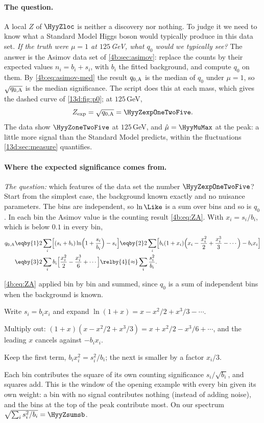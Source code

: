 \paragraph{The question.}
A local $Z$ of $\HyyZloc$ is neither a discovery nor nothing. To judge it we need to know
what a Standard Model Higgs boson would typically produce in this data set. \emph{If the
truth were $\mu=1$ at $125\,$GeV, what $q_0$ would we typically see?} The answer is the
Asimov data set of \cref{4b:sec:asimov}: replace the counts by their expected values
$n_i=b_i+s_i$, with $b_i$ the fitted background, and compute $q_0$ on them. By
\eqref{4b:eq:asimov-med} the result $q_{0,\rm A}$ is the median of $q_0$ under $\mu=1$, so
$\sqrt{q_{0,\rm A}}$ is the median significance. The script does this at each mass, which
gives the dashed curve of \cref{13d:fig:p0}; at $125\,$GeV,
\[
  Z_{\rm exp}=\sqrt{q_{0,\rm A}}=\HyyZexpOneTwoFive .
\]
The data show $\HyyZoneTwoFive$ at $125\,$GeV, and $\hat\mu=\HyyMuMax$ at the peak: a
little more signal than the Standard Model predicts, within the fluctuations
\cref{13d:sec:measure} quantifies.

\paragraph{Where the expected significance comes from.}
\emph{The question:} which features of the data set the number $\HyyZexpOneTwoFive$? Start
from the simplest case, the background known exactly and no nuisance parameters. The
bins are independent, so $\ln\Like$ is a sum over bins and so is $q_0$. In each bin the
Asimov value is the counting result \eqref{4b:eq:ZA}. With $x_i=s_i/b_i$, which is below
$0.1$ in every bin,
\begin{align}
  q_{0,\rm A}
  &\eqby{1} 2\sum_i\Bigl[(s_i+b_i)\ln\Bigl(1+\frac{s_i}{b_i}\Bigr)-s_i\Bigr]
   \eqby{2} 2\sum_i\Bigl[b_i(1+x_i)\Bigl(x_i-\frac{x_i^2}{2}+\frac{x_i^3}{3}-\cdots\Bigr)-b_ix_i\Bigr]
  \nonumber\\
  &\eqby{3} 2\sum_i b_i\Bigl[\frac{x_i^2}{2}-\frac{x_i^3}{6}+\cdots\Bigr]
   \relby{4}{\approx} \sum_i\frac{s_i^2}{b_i} .
  \label{13d:eq:s2b}
\end{align}
\begin{explain}
  \item \eqref{4b:eq:ZA} applied bin by bin and summed, since $q_0$ is a sum of
        independent bins when the background is known.
  \item Write $s_i=b_ix_i$ and expand $\ln(1+x)=x-x^2/2+x^3/3-\cdots$.
  \item Multiply out: $(1+x)(x-x^2/2+x^3/3)=x+x^2/2-x^3/6+\cdots$, and the leading $x$
        cancels against $-b_ix_i$.
  \item Keep the first term, $b_ix_i^2=s_i^2/b_i$; the next is smaller by a factor $x_i/3$.
\end{explain}
Each bin contributes the square of its own counting significance $s_i/\sqrt{b_i}$, and
squares add. This is the window of the opening example with every bin given its own
weight: a bin with no signal contributes nothing (instead of adding noise), and the bins at
the top of the peak contribute most. On our spectrum $\sqrt{\sum_is_i^2/b_i}=\HyyZsumsb$.

